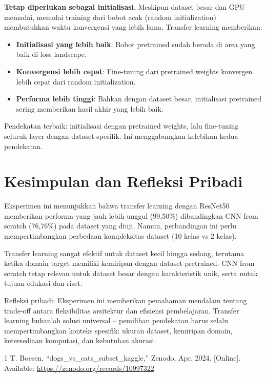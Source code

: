 \documentclass[conference]{IEEEtran}
\begin{document}
\textbf{Tetap diperlukan sebagai initialisasi}. Meskipun dataset besar dan GPU memadai, memulai training dari bobot acak (random initialization) membutuhkan waktu konvergensi yang lebih lama. Transfer learning memberikan:
\begin{itemize}
	\item \textbf{Initialisasi yang lebih baik}: Bobot pretrained sudah berada di area yang baik di loss landscape.
	\item \textbf{Konvergensi lebih cepat}: Fine-tuning dari pretrained weights konvergen lebih cepat dari random initialization.
	\item \textbf{Performa lebih tinggi}: Bahkan dengan dataset besar, initialisasi pretrained sering memberikan hasil akhir yang lebih baik.
\end{itemize}
Pendekatan terbaik: initialisasi dengan pretrained weights, lalu fine-tuning seluruh layer dengan dataset spesifik. Ini menggabungkan kelebihan kedua pendekatan.

\section{Kesimpulan dan Refleksi Pribadi}
Eksperimen ini menunjukkan bahwa transfer learning dengan ResNet50 memberikan performa yang jauh lebih unggul (99,50\%) dibandingkan CNN from scratch (76,76\%) pada dataset yang diuji. Namun, perbandingan ini perlu mempertimbangkan perbedaan kompleksitas dataset (10 kelas vs 2 kelas).

Transfer learning sangat efektif untuk dataset kecil hingga sedang, terutama ketika domain target memiliki kemiripan dengan dataset pretrained. CNN from scratch tetap relevan untuk dataset besar dengan karakteristik unik, serta untuk tujuan edukasi dan riset.

Refleksi pribadi: Eksperimen ini memberikan pemahaman mendalam tentang trade-off antara fleksibilitas arsitektur dan efisiensi pembelajaran. Transfer learning bukanlah solusi universal -- pemilihan pendekatan harus selalu mempertimbangkan konteks spesifik: ukuran dataset, kemiripan domain, ketersediaan komputasi, dan kebutuhan akurasi.

\begin{thebibliography}{1}
	 T. Boesen, ``dogs\_vs\_cats\_subset\_kaggle,'' Zenodo, Apr. 2024. [Online]. Available: \url{https://zenodo.org/records/10997322}
\end{thebibliography}
\end{document}
